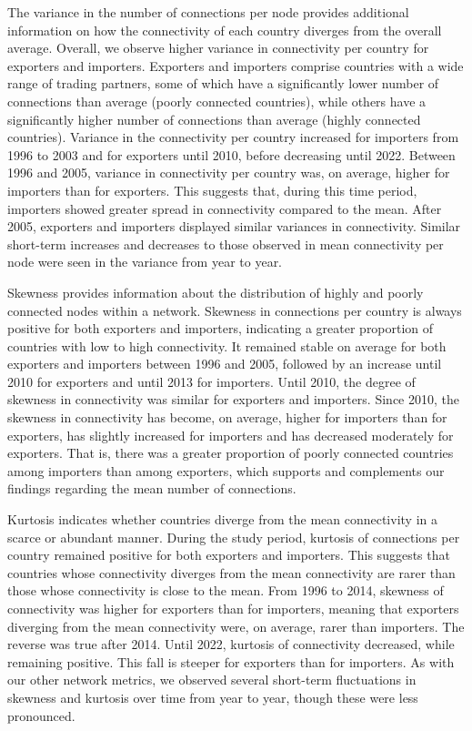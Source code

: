 \documentclass[
  authoryear,
  review,
  3p]{elsarticle}
\begin{document}
The variance in the number of connections per node provides additional
information on how the connectivity of each country diverges from the
overall average. Overall, we observe higher variance in connectivity per
country for exporters and importers. Exporters and importers comprise
countries with a wide range of trading partners, some of which have a
significantly lower number of connections than average (poorly connected
countries), while others have a significantly higher number of
connections than average (highly connected countries). Variance in the
connectivity per country increased for importers from 1996 to 2003 and
for exporters until 2010, before decreasing until 2022. Between 1996 and
2005, variance in connectivity per country was, on average, higher for
importers than for exporters. This suggests that, during this time
period, importers showed greater spread in connectivity compared to the
mean. After 2005, exporters and importers displayed similar variances in
connectivity. Similar short-term increases and decreases to those
observed in mean connectivity per node were seen in the variance from
year to year.

Skewness provides information about the distribution of highly and
poorly connected nodes within a network. Skewness in connections per
country is always positive for both exporters and importers, indicating
a greater proportion of countries with low to high connectivity. It
remained stable on average for both exporters and importers between 1996
and 2005, followed by an increase until 2010 for exporters and until
2013 for importers. Until 2010, the degree of skewness in connectivity
was similar for exporters and importers. Since 2010, the skewness in
connectivity has become, on average, higher for importers than for
exporters, has slightly increased for importers and has decreased
moderately for exporters. That is, there was a greater proportion of
poorly connected countries among importers than among exporters, which
supports and complements our findings regarding the mean number of
connections.

Kurtosis indicates whether countries diverge from the mean connectivity
in a scarce or abundant manner. During the study period, kurtosis of
connections per country remained positive for both exporters and
importers. This suggests that countries whose connectivity diverges from
the mean connectivity are rarer than those whose connectivity is close
to the mean. From 1996 to 2014, skewness of connectivity was higher for
exporters than for importers, meaning that exporters diverging from the
mean connectivity were, on average, rarer than importers. The reverse
was true after 2014. Until 2022, kurtosis of connectivity decreased,
while remaining positive. This fall is steeper for exporters than for
importers. As with our other network metrics, we observed several
short-term fluctuations in skewness and kurtosis over time from year to
year, though these were less pronounced.
\end{document}
